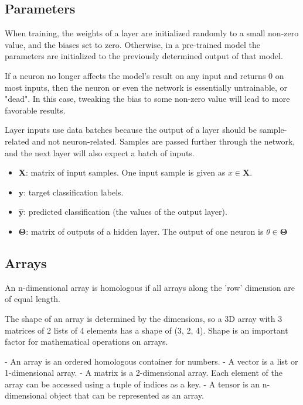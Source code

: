 \documentclass[a4paper]{article}
\newcommand{\matr}[1]{\mathbf{#1}}
\newcommand{\vect}[1]{\bm{#1}}
\begin{document}
\subsection*{Parameters}
When training, the weights of a layer are initialized randomly to a small non-zero value, and the biases set to zero. Otherwise, in a pre-trained model the parameters are initialized to the previously determined output of that model. 

If a neuron no longer affects the model's result on any input and returns 0 on most inputs, then the neuron or even the network is essentially untrainable, or "dead". In this case, tweaking the bias to some non-zero value will lead to more favorable results. 

Layer inputs use data batches because the output of a layer should be sample-related and not neuron-related. Samples are passed further through the network, and the next layer will also expect a batch of inputs. 

\begin{itemize}
    \item $\matr{X}$: matrix of input samples. One input sample is given as $x \in \matr{X}$.
    \item $\bm{y}$: target classification labels.
    \item $\vect{\hat{y}}$: predicted classification (the values of the output layer).
    \item $\matr{\Theta}$: matrix of outputs of a hidden layer. The output of one neuron is $\theta \in \matr{\Theta}$
\end{itemize}


\subsection*{Arrays}
An n-dimensional array is homologous if all arrays along the 'row' dimension are of equal length.

The shape of an array is determined by the dimensions, so a 3D array with 3 matrices of 2 lists of 4 elements has a shape of (3, 2, 4). Shape is an important factor for mathematical operations on arrays.

- An array is an ordered homologous container for numbers.
- A vector is a list or 1-dimensional array.
- A matrix is a 2-dimensional array. Each element of the array can be accessed using a tuple of indices as a key.
- A tensor is an n-dimensional object that can be represented as an array. 
\end{document}

